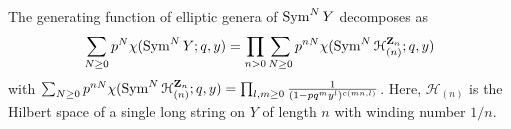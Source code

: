 \documentclass[../main.tex]{subfiles}
\begin{document}

The generating function of elliptic genera of $\operatorname{Sym}^N Y$ decomposes as
\begin{equation}
\sum_{N\geq 0}p^N \chi(\operatorname{Sym}^N Y; q, y) = \prod_{n>0}\sum_{N \geq 0}p^{n N}\chi(\operatorname{Sym}^{N}\mathcal{H}^{\mathbf Z_n}_{(n)}; q, y)
\end{equation}
with $\sum_{N \geq 0}p^{n N}\chi(\operatorname{Sym}^{N}\mathcal{H}^{\mathbf Z_n}_{(n)}; q, y) = \prod_{l, m\geq0}{1 \over (1 - p q^m y^l)^{c(mn, l)}}$. Here, $\mathcal{H}_{(n)}$ is the Hilbert space of a single long string on $Y$ of length $n$ with winding number $1/n$. 
\end{document}
